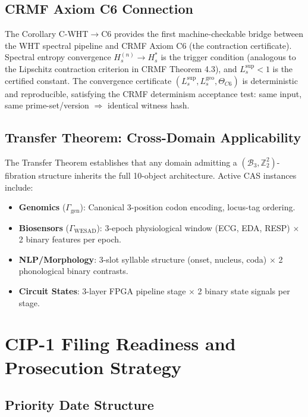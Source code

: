 \documentclass[12pt,letterpaper]{article}
\theoremstyle{definition}
\theoremstyle{plain}
\theoremstyle{remark}
\newcommand{\TC}{\Theta_{C6}}
\newcommand{\Lsup}{L_s^{\sup}}
\newcommand{\Lgeo}{L_s^{\mathrm{geo}}}
\begin{document}
\subsection{CRMF Axiom C6 Connection}

The Corollary C-WHT$\to$C6 provides the first machine-checkable bridge between the WHT spectral pipeline and CRMF Axiom C6 (the contraction certificate). Spectral entropy convergence $H_s^{(n)} \to H_s^*$ is the trigger condition (analogous to the Lipschitz contraction criterion in CRMF Theorem 4.3), and $\Lsup < 1$ is the certified constant. The convergence certificate $({\Lsup}, \Lgeo, \TC)$ is deterministic and reproducible, satisfying the CRMF determinism acceptance test: same input, same prime-set/version $\Rightarrow$ identical witness hash.

\subsection{Transfer Theorem: Cross-Domain Applicability}

The Transfer Theorem establishes that any domain admitting a $(\mathcal{B}_3, \mathbb{Z}_2^2)$-fibration structure inherits the full 10-object architecture. Active CAS instances include:

\begin{itemize}
  \item \textbf{Genomics} ($\Gamma_{\mathrm{gen}}$): Canonical 3-position codon encoding, locus-tag ordering.
  \item \textbf{Biosensors} ($\Gamma_{\mathrm{WESAD}}$): 3-epoch physiological window (ECG, EDA, RESP) $\times$ 2 binary features per epoch.
  \item \textbf{NLP/Morphology}: 3-slot syllable structure (onset, nucleus, coda) $\times$ 2 phonological binary contrasts.
  \item \textbf{Circuit States}: 3-layer FPGA pipeline stage $\times$ 2 binary state signals per stage.
\end{itemize}

\section{CIP-1 Filing Readiness and Prosecution Strategy}

\subsection{Priority Date Structure}
\end{document}
